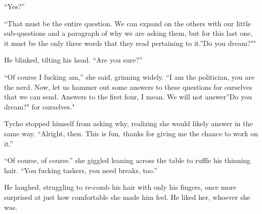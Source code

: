 ``Yes?''

``That must be the entire question. We can expand on the others with our little sub-questions and a paragraph of why we are asking them, but for this last one, it must be the only three words that they read pertaining to it.''Do you dream?""

He blinked, tilting his head. ``Are you sure?''

``Of course I fucking am,'' she said, grinning widely. ``I am the politician, you are the nerd. Now, let us hammer out some answers to these questions for ourselves that we can send. Answers to the first four, I mean. We will not answer''Do you dream?" for ourselves."

Tycho stopped himself from asking why, realizing she would likely answer in the same way. ``Alright, then. This is fun, thanks for giving me the chance to work on it.''

``Of course, of course.'' she giggled leaning across the table to ruffle his thinning hair. ``You fucking taskers, you need breaks, too.''

He laughed, struggling to re-comb his hair with only his fingers, once more surprised at just how comfortable she made him feel. He liked her, whoever she was.
